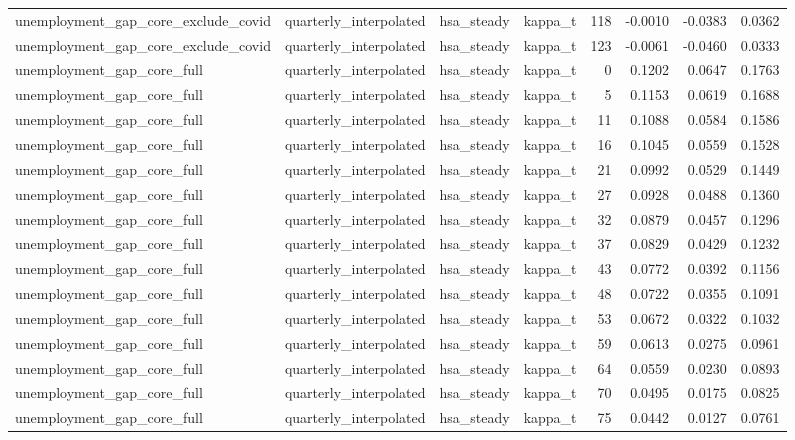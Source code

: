 \begin{tabular}{llllrrrr}
unemployment\_gap\_core\_exclude\_covid & quarterly\_interpolated & hsa\_steady & kappa\_t & 118 & -0.0010 & -0.0383 & 0.0362 \\
unemployment\_gap\_core\_exclude\_covid & quarterly\_interpolated & hsa\_steady & kappa\_t & 123 & -0.0061 & -0.0460 & 0.0333 \\
unemployment\_gap\_core\_full & quarterly\_interpolated & hsa\_steady & kappa\_t & 0 & 0.1202 & 0.0647 & 0.1763 \\
unemployment\_gap\_core\_full & quarterly\_interpolated & hsa\_steady & kappa\_t & 5 & 0.1153 & 0.0619 & 0.1688 \\
unemployment\_gap\_core\_full & quarterly\_interpolated & hsa\_steady & kappa\_t & 11 & 0.1088 & 0.0584 & 0.1586 \\
unemployment\_gap\_core\_full & quarterly\_interpolated & hsa\_steady & kappa\_t & 16 & 0.1045 & 0.0559 & 0.1528 \\
unemployment\_gap\_core\_full & quarterly\_interpolated & hsa\_steady & kappa\_t & 21 & 0.0992 & 0.0529 & 0.1449 \\
unemployment\_gap\_core\_full & quarterly\_interpolated & hsa\_steady & kappa\_t & 27 & 0.0928 & 0.0488 & 0.1360 \\
unemployment\_gap\_core\_full & quarterly\_interpolated & hsa\_steady & kappa\_t & 32 & 0.0879 & 0.0457 & 0.1296 \\
unemployment\_gap\_core\_full & quarterly\_interpolated & hsa\_steady & kappa\_t & 37 & 0.0829 & 0.0429 & 0.1232 \\
unemployment\_gap\_core\_full & quarterly\_interpolated & hsa\_steady & kappa\_t & 43 & 0.0772 & 0.0392 & 0.1156 \\
unemployment\_gap\_core\_full & quarterly\_interpolated & hsa\_steady & kappa\_t & 48 & 0.0722 & 0.0355 & 0.1091 \\
unemployment\_gap\_core\_full & quarterly\_interpolated & hsa\_steady & kappa\_t & 53 & 0.0672 & 0.0322 & 0.1032 \\
unemployment\_gap\_core\_full & quarterly\_interpolated & hsa\_steady & kappa\_t & 59 & 0.0613 & 0.0275 & 0.0961 \\
unemployment\_gap\_core\_full & quarterly\_interpolated & hsa\_steady & kappa\_t & 64 & 0.0559 & 0.0230 & 0.0893 \\
unemployment\_gap\_core\_full & quarterly\_interpolated & hsa\_steady & kappa\_t & 70 & 0.0495 & 0.0175 & 0.0825 \\
unemployment\_gap\_core\_full & quarterly\_interpolated & hsa\_steady & kappa\_t & 75 & 0.0442 & 0.0127 & 0.0761 \\

\end{tabular}
